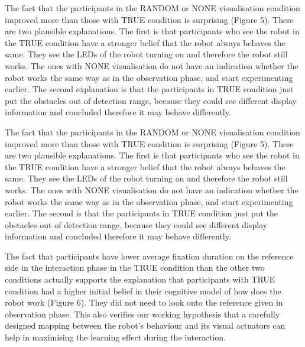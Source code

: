 \documentclass{sig-alternate}
\begin{document}
The fact that the participants in the {\sf RANDOM} or {\sf NONE} visualisation condition improved more than those with {\sf TRUE} condition is surprising (Figure 5). There are two plausible explanations. The first is that participants who see the robot in the {\sf TRUE} condition have a stronger belief that the robot always behaves the same. They see the LEDs of the robot turning on and therefore the robot still works. The ones with {\sf NONE} visualisation do not have an indication whether the robot works the same way as in the observation phase, and start experimenting earlier. The second explanation is that the participants in {\sf TRUE} condition just put the obstacles out of detection range, because they could see different display information and concluded therefore it may behave differently.

The fact that the participants in the {\sf RANDOM} or {\sf NONE} visualisation
condition improved more than those with {\sf TRUE} condition is surprising
(Figure 5). There are two plausible explanations. The first is that
participants who see the robot in the {\sf TRUE} condition have a stronger
belief that the robot always behaves the same. They see the LEDs of the
robot turning on and therefore the robot still works. The ones with {\sf NONE}
visualisation do not have an indication whether the robot works the same
way as in the observation phase, and start experimenting earlier. The
second is that the participants in {\sf TRUE} condition just put the obstacles
out of detection range, because they could see different display
information and concluded therefore it may behave differently.

The fact that participants have lower average fixation duration on the
reference side in the interaction phase in the {\sf TRUE} condition than the
other two conditions actually supports the explanation that participants
with {\sf TRUE} condition had a higher initial belief in their cognitive model
of how does the robot work (Figure 6). They did not need to look onto
the reference given in observation phase. This also verifies our working
hypothesis that a carefully designed mapping between the robot's
behaviour and its visual actuators can help in maximising the learning
effect during the interaction.

\end{document}
